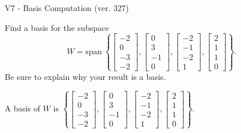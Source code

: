 \begin{exercise}
  \begin{exerciseTitle}V7 - Basis Computation (ver. 327)\end{exerciseTitle}
  \begin{exerciseStatement}
    Find a basis for the subspace 
\[W=\mathrm{span}\ \left\{\left[\begin{array}{r}
-2 \\
0 \\
-3 \\
-2
\end{array}\right] , \left[\begin{array}{r}
0 \\
3 \\
-1 \\
0
\end{array}\right] , \left[\begin{array}{r}
-2 \\
-1 \\
-2 \\
1
\end{array}\right] , \left[\begin{array}{r}
2 \\
1 \\
1 \\
0
\end{array}\right]\right\}.\]
 Be sure to explain why your result is a basis.


  \end{exerciseStatement}
  \begin{exerciseAnswer}
   A basis of \(W\) is  \(\left\{\left[\begin{array}{r}
-2 \\
0 \\
-3 \\
-2
\end{array}\right] , \left[\begin{array}{r}
0 \\
3 \\
-1 \\
0
\end{array}\right] , \left[\begin{array}{r}
-2 \\
-1 \\
-2 \\
1
\end{array}\right] , \left[\begin{array}{r}
2 \\
1 \\
1 \\
0
\end{array}\right]\right\}\).
  


  \end{exerciseAnswer}
\end{exercise}